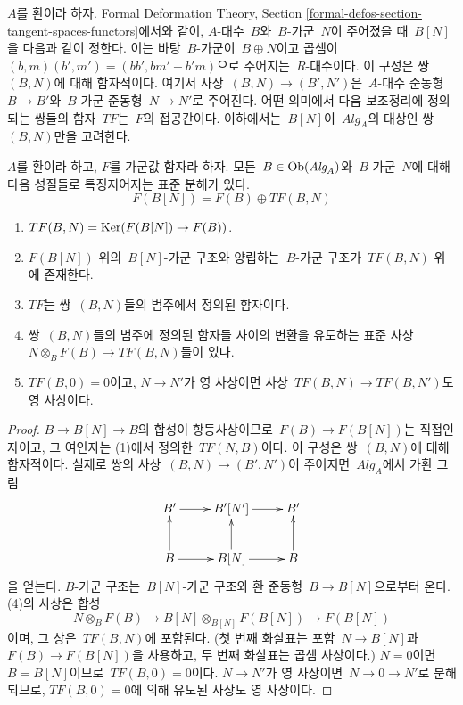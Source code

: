 \noindent
$A$를 환이라 하자. Formal Deformation Theory, Section
\ref{formal-defos-section-tangent-spaces-functors}에서와 같이,
$A$-대수\  $B$와\  $B$-가군\  $N$이 주어졌을 때\  $B[N]$을 다음과 같이
정한다. 이는 바탕\  $B$-가군이\  $B \oplus N$이고 곱셈이\ 
$(b, m)(b', m ') = (bb', bm' + b'm)$으로 주어지는\  $R$-대수이다.
이 구성은 쌍\  $(B, N)$에 대해 함자적이다. 여기서 사상\ 
$(B, N) \to (B', N')$은\  $A$-대수 준동형\  $B \to B'$와\ 
$B$-가군 준동형\  $N \to N'$로 주어진다. 어떤 의미에서 다음
보조정리에 정의되는 쌍들의 함자\  $TF$는\  $F$의 접공간이다.
이하에서는\  $B[N]$이\  $\textit{Alg}_A$의 대상인 쌍\  $(B, N)$만을
고려한다.

\begin{lemma}
\label{lemma-tangent-functor}
$A$를 환이라 하고, $F$를 가군값 함자라 하자.
모든\  $B \in \mathop{\mathrm{Ob}}\nolimits(\textit{Alg}_A)$와\  $B$-가군\  $N$에 대해 다음
성질들로 특징지어지는 표준 분해가 있다.
$$
F(B[N]) = F(B) \oplus TF(B, N)
$$
\begin{enumerate}
\item $TF(B, N) = \mathop{\mathrm{Ker}}(F(B[N]) \to F(B))$.
\item $F(B[N])$ 위의\  $B[N]$-가군 구조와 양립하는\  $B$-가군 구조가\ 
$TF(B, N)$ 위에 존재한다.
\item $TF$는 쌍\  $(B, N)$들의 범주에서 정의된 함자이다.
\item
\label{item-mult-map}
쌍\  $(B, N)$들의 범주에 정의된 함자들 사이의 변환을 유도하는
표준 사상\  $N \otimes_B F(B) \to TF(B, N)$들이 있다.
\item $TF(B, 0) = 0$이고, $N \to N'$가 영 사상이면 사상\ 
$TF(B, N) \to TF(B, N')$도 영 사상이다.
\end{enumerate}
\end{lemma}

\begin{proof}
$B \to B[N] \to B$의 합성이 항등사상이므로\  $F(B) \to F(B[N])$는
직접인자이고, 그 여인자는 (1)에서 정의한\  $TF(N, B)$이다.
이 구성은 쌍\  $(B, N)$에 대해 함자적이다. 실제로 쌍의 사상\ 
$(B, N) \to (B', N')$이 주어지면\  $\textit{Alg}_A$에서 가환 그림
$$
\xymatrix{
B' \ar[r] & B'[N'] \ar[r] & B' \\
B \ar[r] \ar[u] & B[N] \ar[r] \ar[u] & B \ar[u]
}
$$
을 얻는다. $B$-가군 구조는\  $B[N]$-가군 구조와 환 준동형\ 
$B \to B[N]$으로부터 온다. (4)의 사상은 합성
$$
N \otimes_B F(B) \longrightarrow
B[N] \otimes_{B[N]} F(B[N]) \longrightarrow F(B[N])
$$
이며, 그 상은\  $TF(B, N)$에 포함된다. (첫 번째 화살표는 포함\ 
$N \to B[N]$과\  $F(B) \to F(B[N])$을 사용하고, 두 번째 화살표는
곱셈 사상이다.) $N = 0$이면\  $B = B[N]$이므로\  $TF(B, 0) = 0$이다.
$N \to N'$가 영 사상이면\  $N \to 0 \to N'$로 분해되므로,
$TF(B, 0) = 0$에 의해 유도된 사상도 영 사상이다.
\end{proof}

